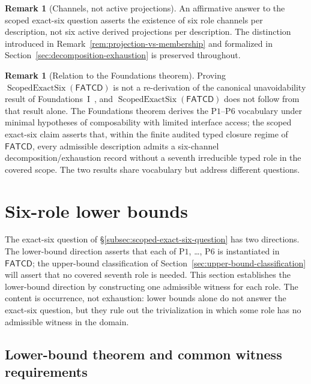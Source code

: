 \documentclass[11pt]{article}
\theoremstyle{definition}
\newtheorem{remark}[theorem]{Remark}
\newcommand{\FATCD}{\ensuremath{\mathsf{FATCD}}}
\newcommand{\ScopedExactSix}[1]{\ensuremath{\operatorname{ScopedExactSix}\!\left(#1\right)}}
\newcommand{\Pone}{\ensuremath{\mathrm{P1}}}
\newcommand{\Psix}{\ensuremath{\mathrm{P6}}}
\begin{document}
\begin{remark}[Channels, not active projections]\label{rem:channel-vs-activation-reminder}
An affirmative answer to the scoped exact-six question asserts the
existence of six role channels per description, not six active derived
projections per description. The distinction introduced in
Remark~\ref{rem:projection-vs-membership} and formalized in
Section~\ref{sec:decomposition-exhaustion} is preserved throughout.
\end{remark}

\begin{remark}[Relation to the Foundations theorem]\label{rem:fatcd-foundations-relation}
Proving \(\ScopedExactSix{\FATCD{}}\) is not a re-derivation of the
canonical unavoidability result of Foundations~I~\citep{Tsiokos2026SixBirdsFoundations},
and \(\ScopedExactSix{\FATCD{}}\) does not follow from that result
alone. The Foundations theorem derives the \Pone{}--\Psix{} vocabulary
under minimal hypotheses of composability with limited interface
access; the scoped exact-six claim asserts that, within the finite
audited typed closure regime of \FATCD{}, every admissible description
admits a six-channel decomposition/exhaustion record without a seventh
irreducible typed role in the covered scope. The two results share
vocabulary but address different questions.
\end{remark}
 \section{Six-role lower bounds}\label{sec:lower-bounds}




The exact-six question of
\S\ref{subsec:scoped-exact-six-question} has two directions. The
lower-bound direction asserts that each of \Pone{}, \ldots, \Psix{}
is instantiated in \FATCD{}; the upper-bound classification of
Section~\ref{sec:upper-bound-classification} will assert that no
covered seventh role is needed. This section establishes the
lower-bound direction by constructing one admissible witness for each
role. The content is occurrence, not exhaustion: lower bounds alone
do not answer the exact-six question, but they rule out the
trivialization in which some role has no admissible witness in the
domain.

\subsection{Lower-bound theorem and common witness requirements}\label{subsec:lower-bound-theorem}
\end{document}
